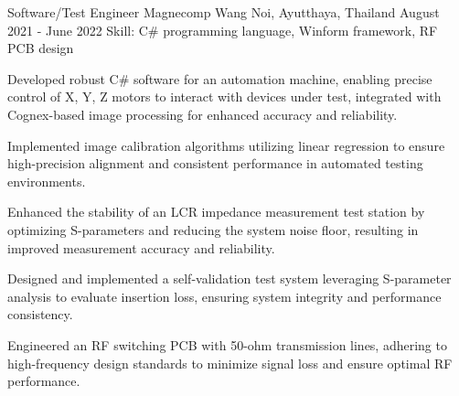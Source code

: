 \begin{cventries}
  \cventry
    {Software/Test Engineer} %
    {Magnecomp} %
    {Wang Noi, Ayutthaya, Thailand} %
    {August 2021 - June 2022} %
    {Skill: C\# programming language, Winform framework, RF PCB design} %
    {
      \begin{cvitems} %
      \item {Developed robust C\# software for an automation machine, enabling precise control of X, Y, Z motors to interact with devices under test, integrated with Cognex-based image processing for enhanced accuracy and reliability.}
      \item {Implemented image calibration algorithms utilizing linear regression to ensure high-precision alignment and consistent performance in automated testing environments.}
      \item {Enhanced the stability of an LCR impedance measurement test station by optimizing S-parameters and reducing the system noise floor, resulting in improved measurement accuracy and reliability.}
      \item {Designed and implemented a self-validation test system leveraging S-parameter analysis to evaluate insertion loss, ensuring system integrity and performance consistency.}
      \item {Engineered an RF switching PCB with 50-ohm transmission lines, adhering to high-frequency design standards to minimize signal loss and ensure optimal RF performance.}
      \end{cvitems}
    }


\end{cventries}

